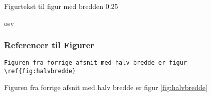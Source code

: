 {Figurtekst til figur med bredden 0.25}

osv

\subsubsection{Referencer til Figurer}

\begin{verbatim}
Figuren fra forrige afsnit med halv bredde er figur \ref{fig:halvbredde}
\end{verbatim}

Figuren fra forrige afsnit med halv bredde er figur \ref{fig:halvbredde}